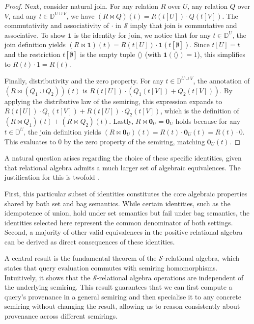 \documentclass[oneside, 11pt]{amsbook}
\theoremstyle{plain}
\theoremstyle{definition}
\theoremstyle{remark}
\begin{document}
\begin{proof}
    Next, consider natural join. For any relation $R$ over $U$, any relation $Q$ over $V$, and any $t \in \mathbb{D}^{U \cup V}$, we have $(R \bowtie Q)(t) = R(t[U]) \cdot Q(t[V])$. The commutativity and associativity of $\cdot$ in $\mathcal{S}$ imply that join is commutative and associative. To show $\mathbf{1}$ is the identity for join, we notice that for any $t \in \mathbb{D}^U$, the join definition yields $(R \bowtie \mathbf{1})(t) = R(t[U]) \cdot \mathbf{1}(t[\emptyset])$. Since $t[U] = t$ and the restriction $t[\emptyset]$ is the empty tuple $\langle \rangle$ (with $\mathbf{1}(\langle \rangle) = 1$), this simplifies to $R(t) \cdot 1 = R(t)$.

    Finally, distributivity and the zero property. For any $t \in \mathbb{D}^{U \cup V}$, the annotation of $(R \bowtie (Q_1 \cup Q_2))(t)$ is $R(t[U]) \cdot (Q_1(t[V]) + Q_2(t[V]))$. By applying the distributive law of the semiring, this expression expands to $R(t[U]) \cdot Q_1(t[V]) + R(t[U]) \cdot Q_2(t[V])$, which is the definition of $(R \bowtie Q_1)(t) + (R \bowtie Q_2)(t)$. Lastly, $R \bowtie \mathbf{0}_U = \mathbf{0}_U$ holds because for any $t \in \mathbb{D}^U$, the join definition yields $(R \bowtie \mathbf{0}_U)(t) = R(t) \cdot \mathbf{0}_U(t) = R(t) \cdot 0$. This evaluates to $0$ by the zero property of the semiring, matching $\mathbf{0}_U(t)$.
\end{proof}

A natural question arises regarding the choice of these specific identities, given that relational algebra admits a much larger set of algebraic equivalences. The justification for this is twofold \cite{Amsterdamer2011a}.

First, this particular subset of identities constitutes the core algebraic properties shared by both set and bag semantics. While certain identities, such as the idempotence of union, hold under set semantics but fail under bag semantics, the identities selected here represent the common denominator of both settings. Second, a majority of other valid equivalences in the positive relational algebra can be derived as direct consequences of these identities.

A central result is the fundamental theorem of the $\mathcal{S}$-relational algebra, which states that query evaluation commutes with semiring homomorphisms. Intuitively, it shows that the $\mathcal{S}$-relational algebra operations are independent of the underlying semiring. This result guarantees that we can first compute a query's provenance in a general semiring and then specialise it to any concrete semiring without changing the result, allowing us to reason consistently about provenance across different semirings.
\end{document}

